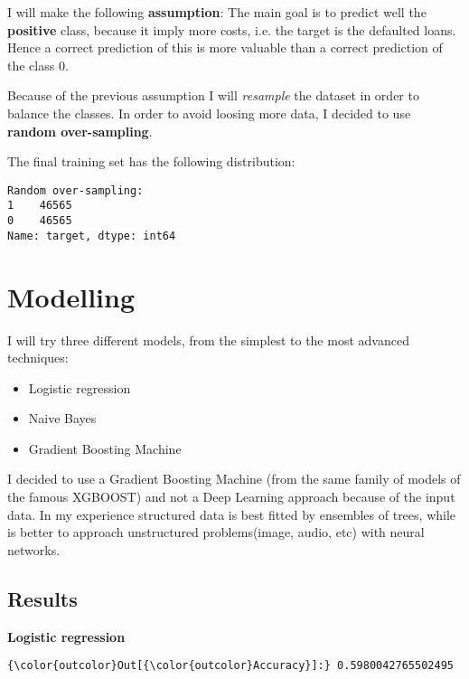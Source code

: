 \documentclass[11pt]{article}
\providecommand{\tightlist}{%
      \setlength{\itemsep}{0pt}\setlength{\parskip}{0pt}}
\begin{document}
I will make the following \textbf{assumption}: The main goal is to predict well the \textbf{positive} class, because it imply more costs, i.e. the target is the defaulted loans. Hence a correct prediction of this is more valuable than a correct prediction of the class 0.

Because of the previous assumption I will \emph{resample} the dataset in order to balance the classes. In order to avoid loosing more data, I decided to use \textbf{random over-sampling}.

\medskip

The final training set has the following distribution:

    \begin{Verbatim}[commandchars=\\\{\}]
Random over-sampling:
1    46565
0    46565
Name: target, dtype: int64

    \end{Verbatim}


\section{Modelling}

I will try three different models, from the simplest to the most advanced
techniques:

\begin{itemize}
\tightlist
\item
  Logistic regression
\item
  Naive Bayes
\item
  Gradient Boosting Machine
\end{itemize}

I decided to use a Gradient Boosting Machine (from the same family of models of the famous XGBOOST) and not a Deep Learning approach because of the input data. In my experience structured data is best fitted by ensembles of trees, while is better to approach unstructured problems(image, audio, etc) with neural networks.


\subsection{Results}

\textbf{Logistic regression}       


\begin{Verbatim}[commandchars=\\\{\}]
{\color{outcolor}Out[{\color{outcolor}Accuracy}]:} 0.5980042765502495
\end{Verbatim}
            
\end{document}
